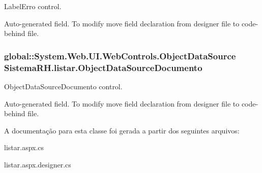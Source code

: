 LabelErro control. 

Auto-\/generated field. To modify move field declaration from designer file to code-\/behind file. \hypertarget{class_sistema_r_h_1_1listar_adc28839cecb1dcfb2e5629dc4d78222d}{
\subsubsection[{ObjectDataSourceDocumento}]{\setlength{\rightskip}{0pt plus 5cm}global::System.Web.UI.WebControls.ObjectDataSource {\bf SistemaRH.listar.ObjectDataSourceDocumento}}}
\label{class_sistema_r_h_1_1listar_adc28839cecb1dcfb2e5629dc4d78222d}


ObjectDataSourceDocumento control. 

Auto-\/generated field. To modify move field declaration from designer file to code-\/behind file. 

A documentação para esta classe foi gerada a partir dos seguintes arquivos:\begin{DoxyCompactItemize}
\item 
listar.aspx.cs\item 
listar.aspx.designer.cs\end{DoxyCompactItemize}
